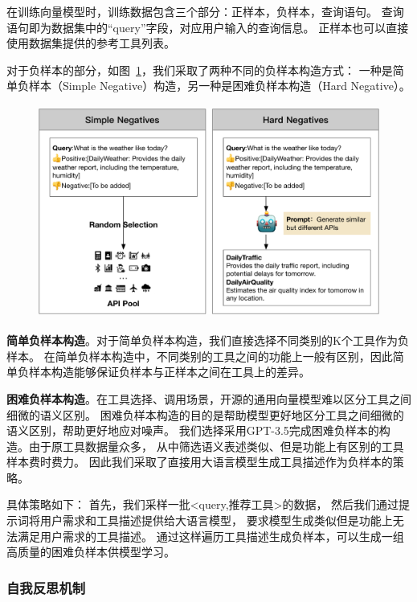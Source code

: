 在训练向量模型时，训练数据包含三个部分：正样本，负样本，查询语句。
查询语句即为数据集中的“query”字段，对应用户输入的查询信息。
正样本也可以直接使用数据集提供的参考工具列表。

对于负样本的部分，如图~\ref{fig:negative-sample-generation}，我们采取了两种不同的负样本构造方式：
一种是简单负样本（Simple Negative）构造，另一种是困难负样本构造（Hard Negative）。

\begin{figure}[!htp]
  \vspace{1em}
  \centering
  \setlength{\abovecaptionskip}{10pt} %
  \includegraphics[height=7cm]{../assets/ch3-负样本构造.pdf}
  \label{fig:negative-sample-generation}
\end{figure}

\indent \textbf{简单负样本构造}。对于简单负样本构造，我们直接选择不同类别的K个工具作为负样本。
在简单负样本构造中，不同类别的工具之间的功能上一般有区别，因此简单负样本构造能够保证负样本与正样本之间在工具上的差异。

\indent \textbf{困难负样本构造}。在工具选择、调用场景，开源的通用向量模型难以区分工具之间细微的语义区别。
困难负样本构造的目的是帮助模型更好地区分工具之间细微的语义区别，帮助更好地应对噪声。
我们选择采用GPT-3.5完成困难负样本的构造。由于原工具数据量众多，
从中筛选语义表述类似、但是功能上有区别的工具样本费时费力。
因此我们采取了直接用大语言模型生成工具描述作为负样本的策略。

具体策略如下：
首先，我们采样一批<query,推荐工具>的数据，
然后我们通过提示词将用户需求和工具描述提供给大语言模型，
要求模型生成类似但是功能上无法满足用户需求的工具描述。
通过这样遍历工具描述生成负样本，可以生成一组高质量的困难负样本供模型学习。

\subsubsection{自我反思机制}

